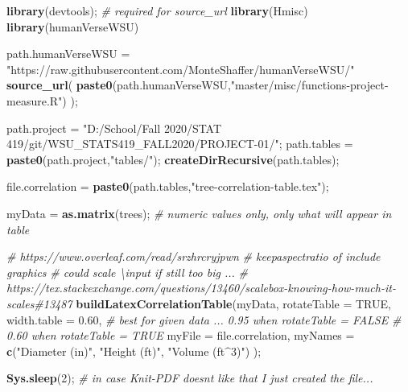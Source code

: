 \documentclass[]{article}
\newenvironment{Shaded}{\begin{snugshade}}{\end{snugshade}}
\newcommand{\CommentTok}[1]{\textcolor[rgb]{0.56,0.35,0.01}{\textit{#1}}}
\newcommand{\DataTypeTok}[1]{\textcolor[rgb]{0.13,0.29,0.53}{#1}}
\newcommand{\DecValTok}[1]{\textcolor[rgb]{0.00,0.00,0.81}{#1}}
\newcommand{\FloatTok}[1]{\textcolor[rgb]{0.00,0.00,0.81}{#1}}
\newcommand{\KeywordTok}[1]{\textcolor[rgb]{0.13,0.29,0.53}{\textbf{#1}}}
\newcommand{\NormalTok}[1]{#1}
\newcommand{\OtherTok}[1]{\textcolor[rgb]{0.56,0.35,0.01}{#1}}
\newcommand{\StringTok}[1]{\textcolor[rgb]{0.31,0.60,0.02}{#1}}
\begin{document}
\begin{Shaded}
\begin{Highlighting}[]
\KeywordTok{library}\NormalTok{(devtools);       }\CommentTok{\# required for source\_url}
\KeywordTok{library}\NormalTok{(Hmisc)}
\KeywordTok{library}\NormalTok{(humanVerseWSU)}

\NormalTok{path.humanVerseWSU =}\StringTok{ "https://raw.githubusercontent.com/MonteShaffer/humanVerseWSU/"}
\KeywordTok{source\_url}\NormalTok{( }\KeywordTok{paste0}\NormalTok{(path.humanVerseWSU,}\StringTok{"master/misc/functions{-}project{-}measure.R"}\NormalTok{) );}

\NormalTok{path.project =}\StringTok{ "D:/School/Fall 2020/STAT 419/git/WSU\_STATS419\_FALL2020/PROJECT{-}01/"}\NormalTok{;}
\NormalTok{path.tables =}\StringTok{ }\KeywordTok{paste0}\NormalTok{(path.project,}\StringTok{"tables/"}\NormalTok{);}
  \KeywordTok{createDirRecursive}\NormalTok{(path.tables);}

\NormalTok{file.correlation =}\StringTok{ }\KeywordTok{paste0}\NormalTok{(path.tables,}\StringTok{"tree{-}correlation{-}table.tex"}\NormalTok{);}

\NormalTok{myData =}\StringTok{ }\KeywordTok{as.matrix}\NormalTok{(trees);  }\CommentTok{\# numeric values only, only what will appear in table}

\CommentTok{\# https://www.overleaf.com/read/srzhrcryjpwn}
\CommentTok{\# keepaspectratio of include graphics }
\CommentTok{\# could scale \textbackslash{}input if still too big ...}
\CommentTok{\# https://tex.stackexchange.com/questions/13460/scalebox{-}knowing{-}how{-}much{-}it{-}scales\#13487}
\KeywordTok{buildLatexCorrelationTable}\NormalTok{(myData, }
  \DataTypeTok{rotateTable =} \OtherTok{TRUE}\NormalTok{,}
  \DataTypeTok{width.table =} \FloatTok{0.60}\NormalTok{, }\CommentTok{\# best for given data ... 0.95 when rotateTable = FALSE}
                      \CommentTok{\# 0.60 when rotateTable = TRUE}
  \DataTypeTok{myFile =}\NormalTok{ file.correlation,}
  \DataTypeTok{myNames =} \KeywordTok{c}\NormalTok{(}\StringTok{"Diameter (in)"}\NormalTok{, }\StringTok{"Height (ft)"}\NormalTok{, }\StringTok{"Volume (ft$\^{}3$)"}\NormalTok{) );}


\KeywordTok{Sys.sleep}\NormalTok{(}\DecValTok{2}\NormalTok{); }\CommentTok{\# in case Knit{-}PDF doesn\textquotesingle{}t like that I just created the file...}
\end{Highlighting}
\end{Shaded}

\newpage



\newpage






\newpage
\theendnotes

\newpage
\begin{auxmulticols}{2}
\singlespacing 


\end{auxmulticols}

\newpage
{
\hypersetup{linkcolor=black}
\setcounter{tocdepth}{3}
\tableofcontents
}
\end{document}
